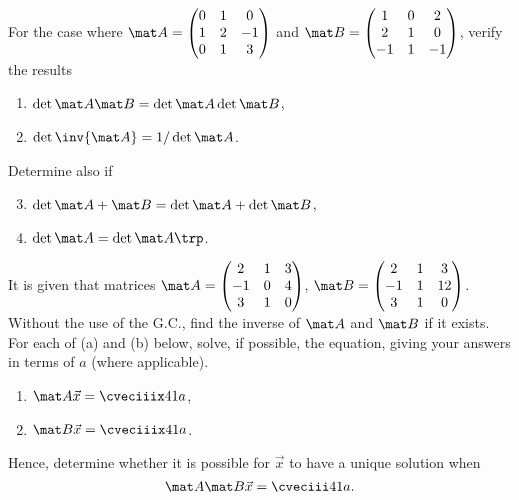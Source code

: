 \begin{problem}
    For the case where $\mat A = \begin{pmatrix} 0 & 1 & 0 \\ 1 & 2 & -1 \\ 0 & 1 & 3 \end{pmatrix}$ and $\mat B = \begin{pmatrix} 1 & 0 & 2 \\ 2 & 1 & 0 \\ -1 & 1 & -1 \end{pmatrix}$, verify the results
    \begin{enumerate}
        \item $\det{\mat A \mat B} = \det{\mat A} \det{\mat B}$,
        \item $\det{\inv{\mat A}} = 1/\det{\mat A}$.
    \end{enumerate}
    Determine also if
    \begin{enumerate}
        \setcounter{enumi}{2}
        \item $\det{\mat A + \mat B} = \det{\mat A} + \det{\mat B}$,
        \item $\det{\mat A} = \det{\mat A\trp}$.
    \end{enumerate}
\end{problem}

\begin{problem}
    It is given that matrices $\mat A = \begin{pmatrix}2 & 1 & 3  \\ -1 & 0 & 4 \\ 3 & 1 & 0\end{pmatrix}$, $\mat B = \begin{pmatrix} 2 & 1 & 3 \\ -1 & 1 & 12 \\ 3 & 1 & 0 \end{pmatrix}$. Without the use of the G.C., find the inverse of $\mat A$ and $\mat B$ if it exists. For each of (a) and (b) below, solve, if possible, the equation, giving your answers in terms of $a$ (where applicable).

    \begin{enumerate}
        \item $\mat A \vec x = \cveciiix41a$,
        \item $\mat B \vec x = \cveciiix41a$.
    \end{enumerate}

    Hence, determine whether it is possible for $\vec x$ to have a unique solution when \[\mat A \mat B \vec x = \cveciii41a.\]
\end{problem}

